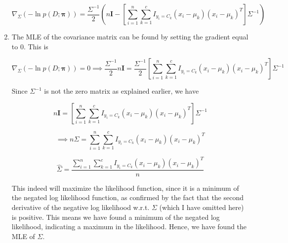 \documentclass[submit]{harvardml}
\begin{document}
\begin{enumerate}
    
    $$\boxed{ \nabla_{\Sigma} (-\ln p(D;\mathbf{\pi}))  = \frac{\Sigma^{-1}}{2}(n\mathbf{I}- [\sum_{i=1}^n\sum_{k=1}^c I_{y_i=C_k} (x_i-\mu_k)(x_i-\mu_k)^T]\Sigma^{-1})  } $$
    
    
    \item The MLE of the covariance matrix can be found by setting the gradient equal to $0$. This is 
    
    $$ \nabla_{\Sigma} (-\ln p(D;\mathbf{\pi})) = 0 \implies \frac{\Sigma^{-1}}{2}n\mathbf{I} = \frac{\Sigma^{-1}}{2} [\sum_{i=1}^n\sum_{k=1}^c I_{y_i=C_k} (x_i-\mu_k)(x_i-\mu_k)^T]\Sigma^{-1}  $$
    
    Since $\Sigma^{-1}$ is not the zero matrix as explained earlier, we have
    
    $$ n\mathbf{I} = [\sum_{i=1}^n \sum_{k=1}^c I_{y_i=C_k}  (x_i-\mu_k)(x_i-\mu_k)^T]\Sigma^{-1}  $$
    
    
    $$\implies n\Sigma= \sum_{i=1}^n \sum_{k=1}^c I_{y_i=C_k} (x_i-\mu_k)(x_i-\mu_k)^T $$
    
    
    $$\boxed{\hat{\Sigma} = \frac{  \sum_{i=1}^n \sum_{k=1}^c I_{y_i=C_k} (x_i-\mu_k)(x_i-\mu_k)^T}{n}} $$
    
    This indeed will maximize the likelihood function, since it is a minimum of the negated log likelihood function, as confirmed by the fact that the second derivative of the negative log likelihood w.r.t. $\Sigma$ (which I have omitted here) is positive. This means we have found a minimum of the negated log likelihood, indicating a maximum in the likelihood. Hence, we have found the MLE of $\Sigma$.
    
    
\end{enumerate}


\newpage
\end{document}
